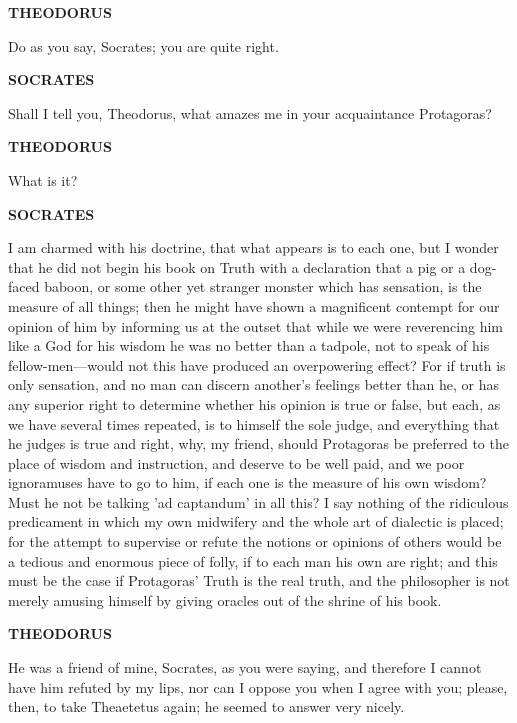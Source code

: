 \documentclass[11pt,letter]{article}
\begin{document}
\par \textbf{THEODORUS}
\par   Do as you say, Socrates; you are quite right.

\par \textbf{SOCRATES}
\par   Shall I tell you, Theodorus, what amazes me in your acquaintance Protagoras?

\par \textbf{THEODORUS}
\par   What is it?

\par \textbf{SOCRATES}
\par   I am charmed with his doctrine, that what appears is to each one, but I wonder that he did not begin his book on Truth with a declaration that a pig or a dog-faced baboon, or some other yet stranger monster which has sensation, is the measure of all things; then he might have shown a magnificent contempt for our opinion of him by informing us at the outset that while we were reverencing him like a God for his wisdom he was no better than a tadpole, not to speak of his fellow-men—would not this have produced an overpowering effect? For if truth is only sensation, and no man can discern another's feelings better than he, or has any superior right to determine whether his opinion is true or false, but each, as we have several times repeated, is to himself the sole judge, and everything that he judges is true and right, why, my friend, should Protagoras be preferred to the place of wisdom and instruction, and deserve to be well paid, and we poor ignoramuses have to go to him, if each one is the measure of his own wisdom? Must he not be talking 'ad captandum' in all this? I say nothing of the ridiculous predicament in which my own midwifery and the whole art of dialectic is placed; for the attempt to supervise or refute the notions or opinions of others would be a tedious and enormous piece of folly, if to each man his own are right; and this must be the case if Protagoras' Truth is the real truth, and the philosopher is not merely amusing himself by giving oracles out of the shrine of his book.

\par \textbf{THEODORUS}
\par   He was a friend of mine, Socrates, as you were saying, and therefore I cannot have him refuted by my lips, nor can I oppose you when I agree with you; please, then, to take Theaetetus again; he seemed to answer very nicely.
\end{document}
